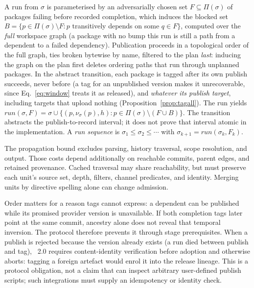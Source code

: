\begin{definition}[run]
\label{def:run}
A run from $\sigma$ is parameterised by an adversarially chosen set
$F \subseteq \Pi(\sigma)$ of packages failing before recorded completion, which induces the
blocked set
$B = \{p \in \Pi(\sigma) \setminus F : p$ transitively depends on some
$q \in F\}$, computed over the \emph{full} workspace graph (a package
with no bump this run is still a path from a dependent to a failed
dependency). Publication proceeds in a topological order of the full
graph, ties broken bytewise by name, filtered to the plan \emph{last}:
inducing the graph on the plan first deletes ordering paths that run
through unplanned packages. In the abstract transition, each package is tagged after its
own publish succeeds, never before (a tag for an unpublished version
makes it unrecoverable, since Eq.~\ref{eq:window} treats it as
released), and \emph{whatever its publish target},
including targets that upload nothing
(Proposition~\ref{prop:tagall}). The run yields
$\mathit{run}(\sigma,F) = \sigma \cup \{(p, \nu_\sigma(p), h) : p \in
\Pi(\sigma) \setminus (F \cup B)\}$. The transition abstracts the publish-to-record interval; it does not
prove that interval atomic in the implementation. A \emph{run sequence} is
$\sigma_1 \leq \sigma_2 \leq \cdots$ with $\sigma_{k+1} =
\mathit{run}(\sigma_k, F_k)$.
\end{definition}

The propagation bound excludes parsing, history traversal, scope resolution,
and output. Those costs depend additionally on reachable commits, parent
edges, and retained provenance. Cached traversal may share reachability, but
must preserve each unit's source set, depth, filters, channel predicates, and
identity. Merging units by directive spelling alone can change admission.

Order matters for a reason tags cannot express: a dependent can be published
while its promised provider version is unavailable. If both completion tags
later point at the same commit, ancestry alone does not reveal that temporal
inversion. The protocol therefore prevents it through stage prerequisites. When a
publish is rejected because the version already exists (a run died
between publish and tag), \lang{}~2.0 requires content-identity verification
before adoption and otherwise aborts: tagging a foreign artefact would enrol
it into the release lineage. This is a protocol obligation, not a claim that
\tool{} can inspect arbitrary user-defined publish scripts; such integrations
must supply an idempotency or identity check.

